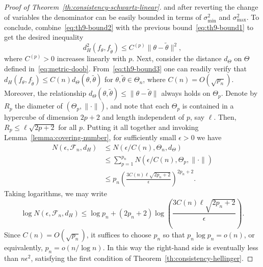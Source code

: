 \begin{proof}[Proof of Theorem~\ref{th:consistency-schwartz-linear}]
and after reverting the change of variables the denominator can be easily bounded in terms of \(\sigma^2_{\text{min}}\) and \(\sigma^2_{\text{max}}\). To conclude, combine~\eqref{eq:th9-bound2} with the previous bound~\eqref{eq:th9-bound1} to get the desired inequality
\begin{equation}\label{eq:th9-bound3}
  d^2_H(f_\theta, f_{\tilde\theta}) \leq C^{(p)} \|\theta - \tilde\theta\|^2,
\end{equation}
where \(C^{(p)}>0\) increases linearly with \(p\).
Next, consider the distance \(d_\Theta\) on \(\Theta\) defined in~\eqref{eq:metric-doob}. From~\eqref{eq:th9-bound3} one can readily verify that \(d_H(f_\theta, f_{\tilde\theta}) \leq C(n) d_\Theta(\theta, \tilde\theta)\) for \(\theta, \tilde\theta \in \Theta_n\), where \(C(n)=O(\sqrt{p_n})\). Moreover, the relationship \(d_\Theta(\theta,\tilde\theta)\leq \|\theta - \tilde\theta\|\) always holds on \(\Theta_p\). Denote by \(R_p\) the diameter of \((\Theta_p, \|\cdot\|)\), and note that each \(\Theta_p\) is contained in a hypercube of dimension \(2p+2\) and length independent of \(p\), say \(\ell\). Then, \(R_p\leq \ell\sqrt{2p+2}\) for all \(p\). Putting it all together and invoking Lemma~\ref{lemma:covering-number}, for sufficiently small \(\epsilon>0\) we have
\begin{align*}
  N(\epsilon, \mathcal F_n, d_H) & \leq N\left(\epsilon/C(n), \Theta_n, d_\Theta\right)                               \\
  & \leq \sum_{p=1}^{p_n} N\left(\epsilon/C(n), \Theta_p, \|\cdot\|\right)             \\
  & \leq p_n \left(\frac{3C(n)\ell\sqrt{2p_n+2}}{\epsilon}\right)^{2p_n+2}.
\end{align*}
Taking logarithms, we may write
\begin{equation}\label{eq:th9-bound-covering}
  \log N(\epsilon, \mathcal F_n, d_H) \leq \log p_n + (2p_n+2) \log\left(\frac{3C(n) \ell\sqrt{2p_n+2}}{\epsilon}\right).
\end{equation}
Since \(C(n)=O(\sqrt{p_n})\), it suffices to choose \(p_n\) so that \(p_n\log p_n = o(n)\), or equivalently, \(p_n=o\left(n/\log n\right)\). In this way the right-hand side is eventually less than \(n\epsilon^2\), satisfying the first condition of Theorem~\ref{th:consistency-hellinger}.


\end{proof}
